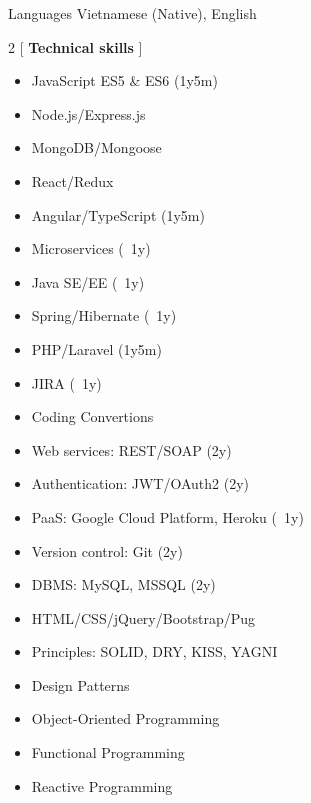 

\begin{cvskills}

  \cvskill
    {Languages} %
    {Vietnamese (Native), English} %


\end{cvskills}

\begin{multicols}{2}
  [
  \textbf{Technical skills}
  ]
  \begin{itemize}
      \item JavaScript ES5 \& ES6 (1y5m)
      \item Node.js/Express.js
      \item MongoDB/Mongoose
      \item React/Redux
      \item Angular/TypeScript (1y5m)
      \item Microservices (~1y)
      \item Java SE/EE (~1y)
      \item Spring/Hibernate (~1y)
      \item PHP/Laravel (1y5m)
      \item JIRA (~1y)
      \item Coding Convertions
      \item Web services: REST/SOAP (2y)
      \item Authentication: JWT/OAuth2 (2y)
      \item PaaS: Google Cloud Platform, Heroku (~1y)
      \item Version control: Git (2y)
      \item DBMS: MySQL, MSSQL (2y)
      \item HTML/CSS/jQuery/Bootstrap/Pug
      \item Principles: SOLID, DRY, KISS, YAGNI
      \item Design Patterns
      \item Object-Oriented Programming
      \item Functional Programming
      \item Reactive Programming
  \end{itemize}
\end{multicols}
